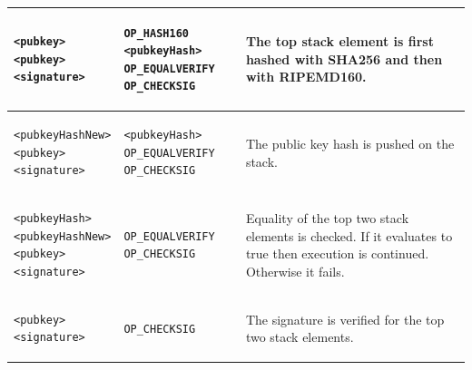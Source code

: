 \begin{table}[!ht]
\begin{minipage}{\textwidth}
\begin{tabular}{| m{95pt} | m{145pt} | m{100pt} |}
\vspace{8pt}
\begin{BVerbatim}[fontsize==\relsize{-4}]
<pubkey>
<pubkey>
<signature>
\end{BVerbatim}
\vspace{4pt}
&
\vspace{8pt}
\begin{BVerbatim}[fontsize==\relsize{-4}]
OP_HASH160 <pubkeyHash>
OP_EQUALVERIFY OP_CHECKSIG
\end{BVerbatim} 
\vspace{4pt}
&
The top stack element is first hashed with SHA256 and then with RIPEMD160.\\ \hline


\vspace{8pt}
\begin{BVerbatim}[fontsize==\relsize{-4}]
<pubkeyHashNew>
<pubkey>
<signature>
\end{BVerbatim}
\vspace{4pt}
&
\vspace{8pt}
\begin{BVerbatim}[fontsize==\relsize{-4}]
<pubkeyHash> OP_EQUALVERIFY
OP_CHECKSIG
\end{BVerbatim} 
\vspace{4pt}
&
The public key hash is pushed on the stack.\\ \hline

	
\vspace{8pt}
\begin{BVerbatim}[fontsize==\relsize{-4}]
<pubkeyHash>
<pubkeyHashNew>
<pubkey> 
<signature>
\end{BVerbatim}
\vspace{4pt}
&
\vspace{8pt}
\begin{BVerbatim}[fontsize==\relsize{-4}]
OP_EQUALVERIFY OP_CHECKSIG
\end{BVerbatim} 
\vspace{4pt}
&
Equality of the top two stack elements is checked. If it evaluates to true then execution is continued. Otherwise it fails.\\ \hline


\vspace{8pt}
\begin{BVerbatim}[fontsize==\relsize{-4}]
<pubkey>
<signature>
\end{BVerbatim}
\vspace{4pt}
&
\vspace{8pt}
\begin{BVerbatim}[fontsize==\relsize{-4}]
OP_CHECKSIG
\end{BVerbatim} 
\vspace{4pt}
&
The signature is verified for the top two stack elements.\\ \hline



\end{tabular}
\end{minipage}
\end{table}
